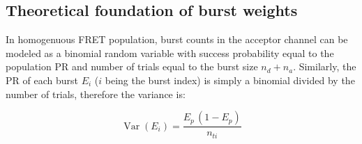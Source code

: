 \subsection{Theoretical foundation of burst weights}
\label{sec:burstweights_theory}
In homogenuous FRET population, burst counts in the acceptor channel can be
modeled as a binomial random variable with success probability equal to the
population PR and number of trials equal to the burst size $n_d + n_a$.
Similarly, the PR of each burst $E_i$ ($i$ being the burst index) is simply a binomial divided by the 
number of trials, therefore the variance is:

\begin{equation}
\label{eq:E_var}
\operatorname{Var} (E_i) = \frac{E_p\,(1 - E_p)}{n_{ti}}
\end{equation}

